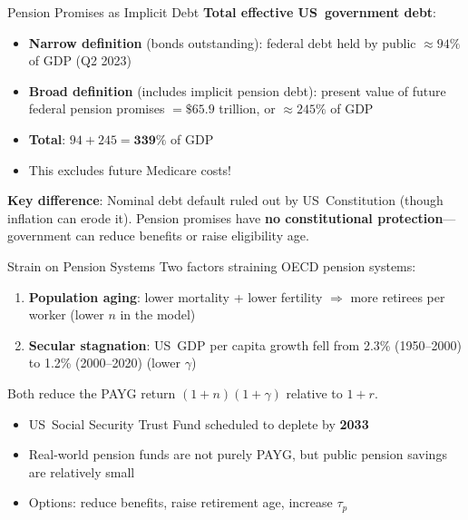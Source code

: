 \documentclass[blue]{beamer}
\begin{document}
\begin{frame}{Pension Promises as Implicit Debt}
	\textbf{Total effective US\ government debt}:
	
	\begin{itemize}
		\item \textbf{Narrow definition} (bonds outstanding): federal debt held by public $\approx 94\%$ of GDP (Q2 2023)
		\item \textbf{Broad definition} (includes implicit pension debt): present value of future federal pension promises $= \$65.9$ trillion, or $\approx 245\%$ of GDP
		\item \textbf{Total}: $94 + 245 = \mathbf{339\%}$ of GDP
		\item This excludes future Medicare costs!
	\end{itemize}
	
	\bigskip
	\textbf{Key difference}: Nominal debt default ruled out by US\ Constitution (though inflation can erode it). Pension promises have \textbf{no constitutional protection}---government can reduce benefits or raise eligibility age.
\end{frame}
\begin{frame}{Strain on Pension Systems}
	Two factors straining OECD pension systems:
	
	\begin{enumerate}
		\item \textbf{Population aging}: lower mortality + lower fertility $\Rightarrow$ more retirees per worker (lower $n$ in the model)
		\item \textbf{Secular stagnation}: US\ GDP per capita growth fell from 2.3\% (1950--2000) to 1.2\% (2000--2020) (lower $\gamma$)
	\end{enumerate}
	
	\bigskip
	Both reduce the PAYG return $(1+n)(1+\gamma)$ relative to $1+r$.
	
	\bigskip
	\begin{itemize}
		\item US\ Social Security Trust Fund scheduled to deplete by \textbf{2033}
		\item Real-world pension funds are not purely PAYG, but public pension savings are relatively small
		\item Options: reduce benefits, raise retirement age, increase $\tau_p$
	\end{itemize}
\end{frame}


\end{document}
